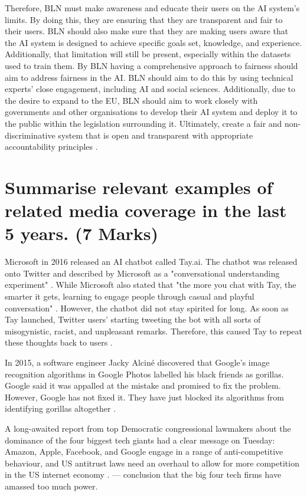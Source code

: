 \documentclass[a4paper,10pt]{article}
\begin{document}
Therefore, BLN must make awareness and educate their users on the AI system's limits. By doing this, they are ensuring that they are transparent and fair to their users. BLN should also make sure that they are making users aware that the AI system is designed to achieve specific goals set, knowledge, and experience.  Additionally, that limitation will still be present, especially within the datasets used to train them. By BLN having a comprehensive approach to fairness should aim to address fairness in the AI. BLN should aim to do this by using technical experts' close engagement, including AI and social sciences. Additionally, due to the desire to expand to the EU, BLN should aim to work closely with governments and other organisations to develop their AI system and deploy it to the public within the legislation surrounding it. Ultimately, create a fair and non-discriminative system that is open and transparent with appropriate accountability principles \cite{adam_slides_regulating_ai}.


\section{Summarise relevant examples of related media coverage in the last 5 years. (7 Marks)}

Microsoft in 2016 released an AI chatbot called Tay.ai. The chatbot was released onto Twitter and described by Microsoft as a "conversational understanding experiment" \cite{msft_twit_ai}. While Microsoft also stated that "the more you chat with Tay, the smarter it gets, learning to engage people through casual and playful conversation" \cite{msft_twit_ai}. However, the chatbot did not stay spirited for long. As soon as Tay launched, Twitter users' starting tweeting the bot with all sorts of misogynistic, racist, and unpleasant remarks. Therefore, this caused Tay to repeat these thoughts back to users \cite{msft_twit_ai}.

In 2015, a software engineer Jacky Alciné discovered that Google's image recognition algorithms in Google Photos labelled his black friends as gorillas. Google said it was appalled at the mistake and promised to fix the problem. However, Google has not fixed it. They have just blocked its algorithms from identifying gorillas altogether \cite{google_gorrila}.

A long-awaited report from top Democratic congressional lawmakers about the dominance of the four biggest tech giants had a clear message on Tuesday: Amazon, Apple, Facebook, and Google engage in a range of anti-competitive behaviour, and US antitrust laws need an overhaul to allow for more competition in the US internet economy \cite{recorde_big_tech}. --- conclusion that the big four tech firms have amassed too much power.
\end{document}
